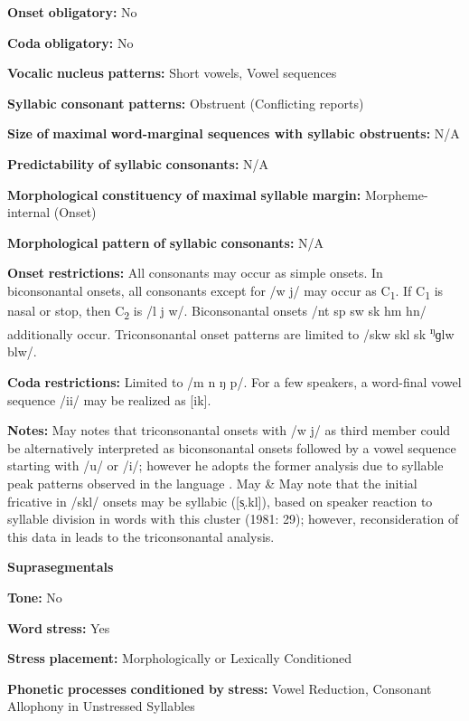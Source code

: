 \begin{styleBody}
\textbf{Onset} \textbf{obligatory:} No

\textbf{Coda} \textbf{obligatory:} No

\textbf{Vocalic} \textbf{nucleus} \textbf{patterns:} Short vowels, Vowel sequences

\textbf{Syllabic} \textbf{consonant} \textbf{patterns:} Obstruent (Conflicting reports)

\textbf{Size} \textbf{of} \textbf{maximal} \textbf{word{}-marginal sequences with syllabic obstruents:} N/A

\textbf{Predictability} \textbf{of} \textbf{syllabic} \textbf{consonants:} N/A

\textbf{Morphological} \textbf{constituency} \textbf{of} \textbf{maximal} \textbf{syllable} \textbf{margin:} Morpheme-internal (Onset)

\textbf{Morphological} \textbf{pattern} \textbf{of} \textbf{syllabic} \textbf{consonants:} N/A

\textbf{Onset} \textbf{restrictions:} All consonants may occur as simple onsets. In biconsonantal onsets, all consonants except for /w j/ may occur as C\textsubscript{1}. If C\textsubscript{1} is nasal or stop, then C\textsubscript{2} is /l j w/. Biconsonantal onsets /nt sp sw sk hm hn/ additionally occur. Triconsonantal onset patterns are limited to /skw skl sk \textsuperscript{ŋ}ɡlw blw/.

\textbf{Coda} \textbf{restrictions:} Limited to /m n ŋ p/. For a few speakers, a word-final vowel sequence /ii/ may be realized as [ik].

\textbf{Notes:} May notes that triconsonantal onsets with /w j/ as third member could be alternatively interpreted as biconsonantal onsets followed by a vowel sequence starting with /u/ or /i/; however he adopts the former analysis due to syllable peak patterns observed in the language \citep[17-18]{May1997}. May \& May note that the initial fricative in /skl/ onsets may be syllabic ([s̩.kl]), based on speaker reaction to syllable division in words with this cluster (1981: 29); however, reconsideration of this data in \citet{May1997} leads to the triconsonantal analysis.

\textbf{Suprasegmentals}

\textbf{Tone:} No

\textbf{Word} \textbf{stress:} Yes

\textbf{Stress} \textbf{placement:} Morphologically or Lexically Conditioned

\textbf{Phonetic} \textbf{processes} \textbf{conditioned} \textbf{by} \textbf{stress:} Vowel Reduction, Consonant Allophony in Unstressed Syllables


\end{styleBody}

